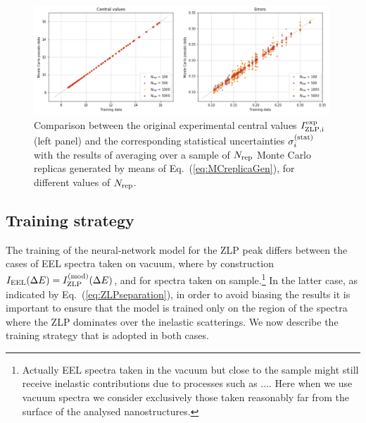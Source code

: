\begin{figure}[t]
    \centering
    \includegraphics[width=0.99\textwidth]{plots/MC.png}
    \caption{Comparison between the original experimental central values
      $I_{\rm ZLP,i}^{\rm exp}$ (left panel) and the corresponding statistical
      uncertainties $\sigma_i^{(\rm stat)}$ with the results of averaging over
      a sample of $N_{\rm rep}$ Monte Carlo replicas generated by means of
      Eq.~(\ref{eq:MCreplicaGen}), for different values of
      $N_{\rm rep}$.
      }
    \label{fig:MC}
\end{figure}

\subsection{Training strategy}
\label{sec:training}

The training of the neural-network model for the ZLP peak differs between
the cases of EEL spectra taken on vacuum, where by construction $I_{\rm EEL}(\Delta E) =I_{\rm ZLP}^{\rm (mod)}(\Delta E)$,
and for spectra taken on sample.\footnote{Actually EEL spectra taken in the vacuum but close
  to the sample might still receive inelastic contributions due to processes such as .... Here
  when we use vacuum spectra we consider exclusively those taken reasonably far from the surface
of the analysed nanostructures.}
%
In the latter case, as indicated by Eq.~(\ref{eq:ZLPseparation}), in order to avoid
biasing the results it is
important to ensure that the model is trained only on the region of the spectra
where the ZLP dominates over the inelastic scatterings.
%
We now describe the training strategy that is adopted in both cases.

